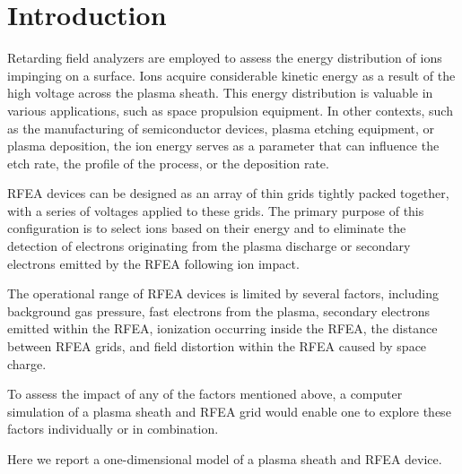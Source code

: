 \section{\label{Introduction}Introduction}

Retarding field analyzers are employed to assess the energy distribution of ions impinging on a surface. Ions acquire considerable kinetic energy as a result of the high voltage across the plasma sheath. This energy distribution is valuable in various applications, such as space propulsion equipment. In other contexts, such as the manufacturing of semiconductor devices, plasma etching equipment, or plasma deposition, the ion energy serves as a parameter that can influence the etch rate, the profile of the process, or the deposition rate.

RFEA devices can be designed as an array of thin grids tightly packed together, with a series of voltages applied to these grids. The primary purpose of this configuration is to select ions based on their energy and to eliminate the detection of electrons originating from the plasma discharge or secondary electrons emitted by the RFEA following ion impact. 

The operational range of RFEA devices is limited by several factors, including background gas pressure, fast electrons from the plasma, secondary electrons emitted within the RFEA, ionization occurring inside the RFEA, the distance between RFEA grids, and field distortion within the RFEA caused by space charge.

To assess the impact of any of the factors mentioned above, a computer simulation of a plasma sheath and RFEA grid would enable one to explore these factors individually or in combination.

Here we report a one-dimensional model of a plasma sheath and RFEA device. 
